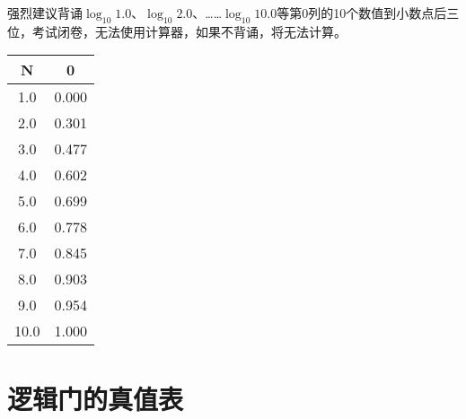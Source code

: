 强烈建议背诵$\log_{10} 1.0$、$\log_{10} 2.0$、……$\log_{10} 10.0$等第0列的10个数值到小数点后三位，考试闭卷，无法使用计算器，如果不背诵，将无法计算。

\begin{longtable}[c]{|c|c|}
  \hline
  \textbf{N} & \textbf{0}  \\
  \hline
  \endhead
  \num{1.0}  & \num{.000}  \\ \hline
  \num{2.0}  & \num{.301}  \\ \hline
  \num{3.0}  & \num{.477}  \\ \hline
  \num{4.0}  & \num{.602}  \\ \hline
  \num{5.0}  & \num{.699}  \\ \hline
  \num{6.0}  & \num{.778}  \\ \hline
  \num{7.0}  & \num{.845}  \\ \hline
  \num{8.0}  & \num{.903}  \\ \hline
  \num{9.0}  & \num{.954}  \\ \hline
  \num{10.0} & \num{1.000} \\ \hline
\end{longtable}

\newpage

\section{逻辑门的真值表}

